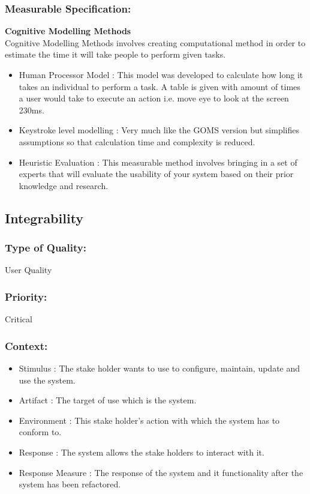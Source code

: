 \documentclass[11pt]{article}
\begin{document}
		\subsubsection{Measurable Specification:}
			\textbf{Cognitive Modelling Methods}\\
				Cognitive Modelling Methods involves creating computational method in order to estimate the time it will take people to perform given tasks.
			\begin{itemize}			
			
				\item Human Processor Model : This model was developed to calculate how long it takes an individual to perform a task. A table is given with amount of times a user would take to execute an action i.e. move eye to look at the screen 230ms.
				\item Keystroke level modelling : Very much like the GOMS version but simplifies assumptions so that calculation time and complexity is reduced.
				\item  Heuristic Evaluation	 : This measurable method involves bringing in a set of experts that will evaluate the usability of your system based on their prior knowledge and research. 
			
			\end{itemize}
		
	\subsection{Integrability}
		
		\subsubsection{Type of Quality:}
			\textbf{} User Quality
		
		\subsubsection{Priority:}
		\textbf{} Critical

		\subsubsection{Context:}
			\begin{itemize}
				\item Stimulus : The stake holder wants to use to configure, maintain, update and use the system.
				\item Artifact : The target of use which is the system.
				\item Environment : This stake holder’s action with which the system has to conform to.
				\item Response : The system allows the stake holders to interact with it.
				\item Response Measure : The response of the system and it functionality after the system has  been refactored.
			\end{itemize}
		
\end{document}
